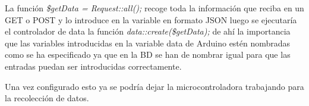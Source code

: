 La función \textit{\$getData = Request::all();} recoge toda la información que reciba en un GET o POST y lo introduce en la variable en formato JSON luego se ejecutaría el controlador de data la función \textit{data::create(\$getData);} de ahí la importancia que las variables introducidas en la variable data de Arduino estén nombradas como se ha especificado ya que en la BD se han de nombrar igual para que las entradas puedan ser introducidas correctamente.

Una vez configurado esto ya se podría dejar la microcontroladora trabajando para la recolección de datos.
